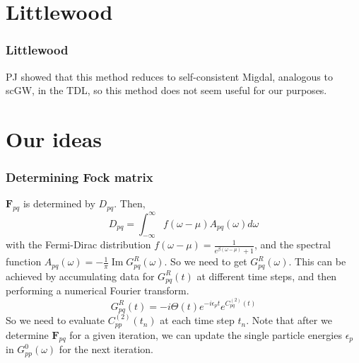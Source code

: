 \section{Littlewood}
\begin{frame}
    \frametitle{Littlewood}
PJ showed that this method reduces to self-consistent Migdal, analogous to scGW, in the TDL, so this method does not seem useful for our purposes.
\end{frame}
\section{Our ideas}
\begin{frame}
    \frametitle{Determining Fock matrix}
$\bm{F}_{pq}$ is determined by $D_{pq}$. Then,
\begin{equation}
    D_{pq} = \int_{-\infty}^{\infty} f(\omega - \mu) A_{pq}(\omega) d \omega
\end{equation}
with the Fermi-Dirac distribution $f(\omega - \mu) = \frac{1}{e^{\beta(\omega - \mu)} + 1}$, and the spectral function $A_{pq}(\omega) = -\frac{1}{\pi} \operatorname{Im} G^R_{pq}(\omega)$. So we need to get $G^R_{pq}(\omega)$. This can be achieved by accumulating data for $G^R_{pq}(t)$ at different time steps, and then performing a numerical Fourier transform.
\begin{equation}
    G^R_{pq}(t) = -i \Theta(t) e^{-i \epsilon_p t} e^{C_{pq}^{(2)}(t)}
\label{eq:sc_cumulant_greens_time}
\end{equation}
So we need to evaluate $C_{pp}^{(2)}(t_n)$ at each time step $t_n$. Note that after we determine $\bm{F}_{pq}$ for a given iteration, we can update the single particle energies $\epsilon_p$ in $G^0_{pp}(\omega)$ for the next iteration.
\end{frame}

